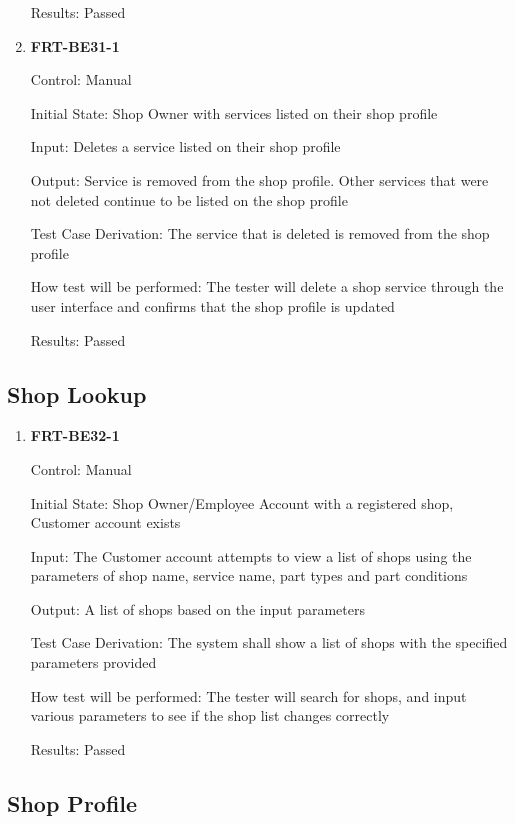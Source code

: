 \documentclass[12pt, titlepage]{article}
\begin{document}
\begin{enumerate}
	      Results: Passed

	\item \textbf{FRT-BE31-1}

	      Control: Manual

	      Initial State: Shop Owner with services listed on their shop profile

	      Input: Deletes a service listed on their shop profile

	      Output: Service is removed from the shop profile. Other services that were not deleted continue to
	      be listed on the shop profile

	      Test Case Derivation: The service that is deleted is removed from the shop profile

	      How test will be performed: The tester will delete a shop service through the user interface and
	      confirms that the shop profile is updated

	      Results: Passed

\end{enumerate}

\subsection{Shop Lookup}

\begin{enumerate}
	\item \textbf{FRT-BE32-1}

	      Control: Manual

	      Initial State: Shop Owner/Employee Account with a registered shop, Customer account exists

	      Input: The Customer account attempts to view a list of shops using the parameters of shop name,
	      service name, part types and part conditions

	      Output: A list of shops based on the input parameters

	      Test Case Derivation: The system shall show a list of shops with the specified parameters provided

	      How test will be performed: The tester will search for shops, and input various parameters to see
	      if the shop list changes correctly

	      Results: Passed

\end{enumerate}

\subsection{Shop Profile}
\end{document}

